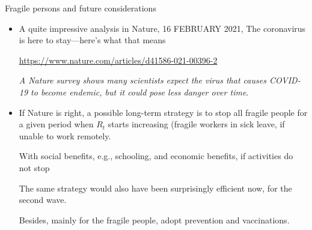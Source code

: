 \documentclass[8pt]{beamer}
\begin{document}
\begin{frame}{Fragile persons and future considerations}

\begin{itemize}

\item A quite impressive analysis in Nature, 16 FEBRUARY 2021, 
The coronavirus is here to stay---here's what that means

\medskip

\url{https://www.nature.com/articles/d41586-021-00396-2}

\medskip

\emph{A Nature survey shows many scientists expect the virus that causes COVID-19 to become endemic, but it could pose less danger over time}.

\medskip

\item
If Nature is right, a possible long-term strategy is to stop all fragile people for a given period when $R_t$ starts increasing (fragile workers in sick leave, if unable to work remotely.

\medskip

With social benefits, e.g., schooling, and economic benefits, if activities do not stop

\medskip

The same strategy would also have been surprisingly efficient now, for the second wave.

\medskip

Besides, mainly for the fragile people, adopt prevention and vaccinations.
\end{itemize}

\end{frame}
\end{document}
